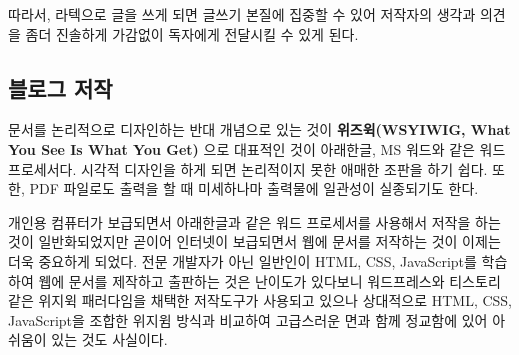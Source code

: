 \documentclass[
  letterpaper,
]{book}
\begin{document}
따라서, 라텍으로 글을 쓰게 되면 글쓰기 본질에 집중할 수 있어 저작자의
생각과 의견을 좀더 진솔하게 가감없이 독자에게 전달시킬 수 있게 된다.

\hypertarget{uxbe14uxb85cuxadf8-uxc800uxc791}{%
\subsection{블로그 저작}\label{uxbe14uxb85cuxadf8-uxc800uxc791}}

문서를 논리적으로 디자인하는 반대 개념으로 있는 것이
\textbf{위즈윅(WSYIWIG, What You See Is What You Get)} 으로 대표적인
것이 아래한글, MS 워드와 같은 워드 프로세서다. 시각적 디자인을 하게 되면
논리적이지 못한 애매한 조판을 하기 쉽다. 또한, PDF 파일로도 출력을 할 때
미세하나마 출력물에 일관성이 실종되기도 한다.

개인용 컴퓨터가 보급되면서 아래한글과 같은 워드 프로세서를 사용해서
저작을 하는 것이 일반화되었지만 곧이어 인터넷이 보급되면서 웹에 문서를
저작하는 것이 이제는 더욱 중요하게 되었다. 전문 개발자가 아닌 일반인이
HTML, CSS, JavaScript를 학습하여 웹에 문서를 제작하고 출판하는 것은
난이도가 있다보니 워드프레스와 티스토리 같은 위지윅 패러다임을 채택한
저작도구가 사용되고 있으나 상대적으로 HTML, CSS, JavaScript을 조합한
위지윔 방식과 비교하여 고급스러운 면과 함께 정교함에 있어 아쉬움이 있는
것도 사실이다.
\end{document}
